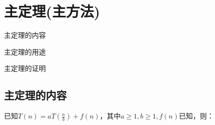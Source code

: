 \chapter{主定理(主方法)}
\begin{introduction}
	\item 主定理的内容
	\item 主定理的用途
	\item 主定理的证明
\end{introduction}
\section{主定理的内容}
已知$T(n) = a T(\frac{n}{b}) + f(n)$，其中$a\geq 1, b\geq 1, f(n)$已知，则：
